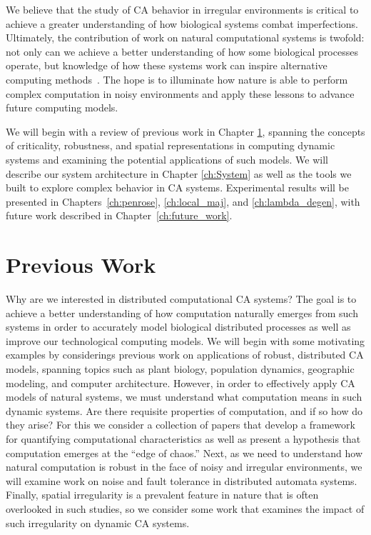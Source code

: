 \documentclass[a4paper,11pt,twoside]{report}
\begin{document}
We believe that the study of CA behavior in irregular environments is critical to achieve a greater understanding of how biological systems combat imperfections. Ultimately, the contribution of work on natural computational systems is twofold: not only can we achieve a better understanding of how some biological processes operate, but knowledge of how these systems work can inspire alternative computing methods~\cite{ma96, si04}. The hope is to illuminate how nature is able to perform complex computation in noisy environments and apply these lessons to advance future computing models.

We will begin with a review of previous work in Chapter \ref{ch:Prev}, spanning the concepts of criticality, robustness, and spatial representations in computing dynamic systems and examining the potential applications of such models. We will describe our system architecture in Chapter \ref{ch:System} as well as the tools we built to explore complex behavior in CA systems. Experimental results will be presented in Chapters~\ref{ch:penrose}, \ref{ch:local_maj}, and \ref{ch:lambda_degen}, with future work described in Chapter~\ref{ch:future_work}.

\chapter{Previous Work}
\label{ch:Prev}

Why are we interested in distributed computational CA systems? The goal is to achieve a better understanding of how computation naturally emerges from such systems in order to accurately model biological distributed processes as well as improve our technological computing models. We will begin with some motivating examples by considerings previous work on applications of robust, distributed CA models, spanning topics such as plant biology, population dynamics, geographic modeling, and computer architecture. However, in order to effectively apply CA models of natural systems, we must understand what computation means in such dynamic systems. Are there requisite properties of computation, and if so how do they arise? For this we consider a collection of papers that develop a framework for quantifying computational characteristics as well as present a hypothesis that computation emerges at the ``edge of chaos.'' Next, as we need to understand how natural computation is robust in the face of noisy and irregular environments, we will examine work on noise and fault tolerance in distributed automata systems. Finally, spatial irregularity is a prevalent feature in nature that is often overlooked in such studies, so we consider some work that examines the impact of such irregularity on dynamic CA systems.
\end{document}
